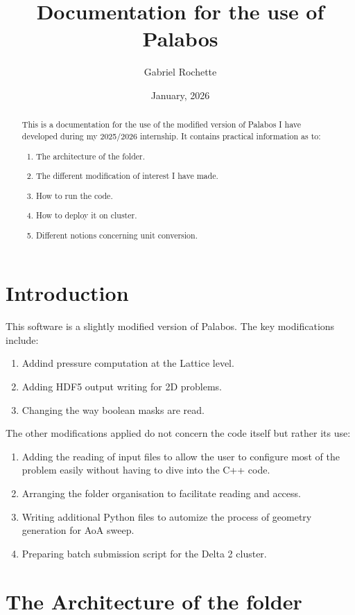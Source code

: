\documentclass{article}
\date{January, 2026}
\title{Documentation for the use of Palabos}
\author{Gabriel Rochette}
\begin{document}
\maketitle

\begin{abstract}
This is a documentation for the use of the modified version of Palabos I have developed during my 2025/2026 internship. It contains practical information as to:
\begin{enumerate}
    \item The architecture of the folder.
    \item The different modification of interest I have made.
    \item How to run the code.
    \item How to deploy it on cluster.
    \item Different notions concerning unit conversion.
\end{enumerate}
\end{abstract}

\section{Introduction}

This software is a slightly modified version of Palabos. The key modifications include:
\begin{enumerate}
    \item Addind pressure computation at the Lattice level.
    \item Adding HDF5 output writing for 2D problems.
    \item Changing the way boolean masks are read.
\end{enumerate}
The other modifications applied do not concern the code itself but rather its use: 
\begin{enumerate}
    \item Adding the reading of input files to allow the user to configure most of the problem easily without having to dive into the C++ code.
    \item Arranging the folder organisation to facilitate reading and access.
    \item Writing additional Python files to automize the process of geometry generation for AoA sweep.
    \item Preparing batch submission script for the Delta 2 cluster.
\end{enumerate}

\section{The Architecture of the folder}
\end{document}
